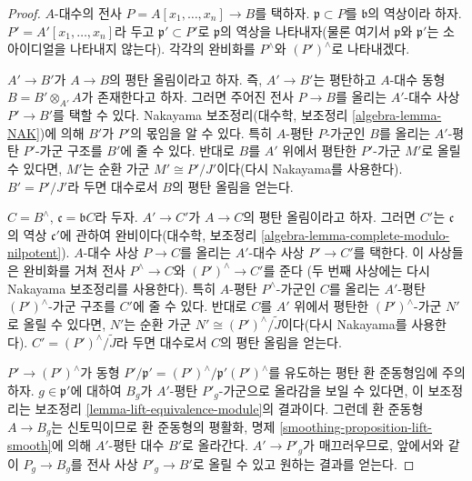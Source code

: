 \begin{proof}
$A$-대수의 전사 $P = A[x_1, \ldots, x_n] \to B$를 택하자.
$\mathfrak p \subset P$를 $\mathfrak b$의 역상이라 하자.
$P' = A'[x_1, \ldots, x_n]$라 두고 $\mathfrak p' \subset P'$로
$\mathfrak p$의 역상을 나타내자(물론 여기서 $\mathfrak p$와
$\mathfrak p'$는 소 아이디얼을 나타내지 않는다). 각각의 완비화를
$P^\wedge$와 $(P')^\wedge$로 나타내겠다.

\medskip\noindent
$A' \to B'$가 $A \to B$의 평탄 올림이라고 하자. 즉,
$A' \to B'$는 평탄하고 $A$-대수 동형 $B = B' \otimes_{A'} A$가
존재한다고 하자. 그러면 주어진 전사 $P \to B$를 올리는 $A'$-대수
사상 $P' \to B'$를 택할 수 있다. Nakayama 보조정리(대수학, 보조정리
\ref{algebra-lemma-NAK})에 의해 $B'$가 $P'$의 몫임을 알 수 있다.
특히 $A$-평탄 $P$-가군인 $B$를 올리는 $A'$-평탄 $P'$-가군 구조를
$B'$에 줄 수 있다. 반대로 $B$를 $A'$ 위에서 평탄한 $P'$-가군 $M'$로
올릴 수 있다면, $M'$는 순환 가군 $M' \cong P'/J'$이다(다시 Nakayama를
사용한다). $B' = P'/J'$라 두면 대수로서 $B$의 평탄 올림을 얻는다.

\medskip\noindent
$C = B^\wedge$, $\mathfrak c = \mathfrak bC$라 두자.
$A' \to C'$가 $A \to C$의 평탄 올림이라고 하자. 그러면 $C'$는
$\mathfrak c$의 역상 $\mathfrak c'$에 관하여 완비이다(대수학, 보조정리
\ref{algebra-lemma-complete-modulo-nilpotent}). $A$-대수 사상
$P \to C$를 올리는 $A'$-대수 사상 $P' \to C'$를 택한다. 이 사상들은
완비화를 거쳐 전사 $P^\wedge \to C$와 $(P')^\wedge \to C'$를 준다
(두 번째 사상에는 다시 Nakayama 보조정리를 사용한다). 특히
$A$-평탄 $P^\wedge$-가군인 $C$를 올리는 $A'$-평탄
$(P')^\wedge$-가군 구조를 $C'$에 줄 수 있다. 반대로 $C$를 $A'$ 위에서
평탄한 $(P')^\wedge$-가군 $N'$로 올릴 수 있다면, $N'$는 순환 가군
$N' \cong (P')^\wedge/\tilde J$이다(다시 Nakayama를 사용한다).
$C' = (P')^\wedge/\tilde J$라 두면 대수로서 $C$의 평탄 올림을 얻는다.

\medskip\noindent
$P' \to (P')^\wedge$가 동형
$P'/\mathfrak p' = (P')^\wedge/\mathfrak p'(P')^\wedge$를 유도하는 평탄
환 준동형임에 주의하자. $g \in \mathfrak p'$에 대하여 $B_g$가
$A'$-평탄 $P'_g$-가군으로 올라감을 보일 수 있다면, 이 보조정리는
보조정리 \ref{lemma-lift-equivalence-module}의 결과이다. 그런데 환 준동형
$A \to B_g$는 신토믹이므로 환 준동형의 평활화, 명제
\ref{smoothing-proposition-lift-smooth}에 의해 $A'$-평탄 대수 $B'$로
올라간다. $A' \to P'_g$가 매끄러우므로, 앞에서와 같이
$P_g \to B_g$를 전사 사상 $P'_g \to B'$로 올릴 수 있고 원하는 결과를
얻는다.
\end{proof}

